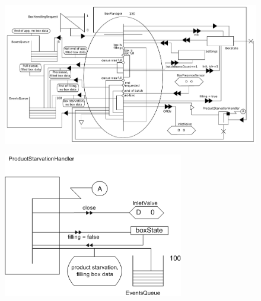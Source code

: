 \documentclass{beamer}
\begin{document}
	\begin{frame}
	    \begin{figure}
		    \centering
		    \includegraphics[width=\textwidth]{../../SchemasLCG/BoxManager.pdf}
	    \end{figure}
	\end{frame}

	\begin{frame}
	    \begin{figure}
		    \centering
		    \includegraphics[width=0.7\textwidth]{../../SchemasLCG/ProductStarvationHandler.png}
	    \end{figure}
	\end{frame}
\end{document}
